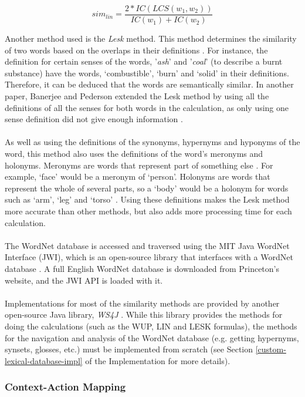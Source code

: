 \documentclass[11pt]{article}
\begin{document}
$$sim_{lin} = \frac{2*IC(LCS(w_1,w_2))}{IC(w_1)+IC(w_2)}$$

Another method used is the \textit{Lesk} method. This method determines the similarity of two words based on the overlaps in their definitions \cite{RefWorks:115}. For instance, the definition for certain senses of the words, '\textit{ash}' and '\textit{coal}' (to describe a burnt substance) have the words, `combustible', `burn' and `solid' in their definitions. Therefore, it can be deduced that the words are semantically similar. In another paper, Banerjee and Pederson extended the Lesk method by using all the definitions of all the senses for both words in the calculation, as only using one sense definition did not give enough information \cite{RefWorks:117}.
\\
\\
As well as using the definitions of the synonyms, hypernyms and hyponyms of the word, this method also uses the definitions of the word's meronyms and holonyms. Meronyms are words that represent part of something else \cite{RefWorks:121}. For example, `face' would be a meronym of `person'. Holonyms are words that represent the whole of several parts, so a `body' would be a holonym for words such as `arm', `leg' and `torso' \cite{RefWorks:121}. Using these definitions makes the Lesk method more accurate than other methods, but also adds more processing time for each calculation.
\\
\\
The WordNet database is accessed and traversed using the MIT Java WordNet Interface (JWI), which is an open-source library that interfaces with a WordNet database \cite{RefWorks:118}. A full English WordNet database is downloaded from Princeton's website, and the JWI API is loaded with it.
\\
\\
Implementations for most of the similarity methods are provided by another open-source Java library, \textit{WS4J} \cite{RefWorks:116}. While this library provides the methods for doing the calculations (such as the WUP, LIN and LESK formulas), the methods for the navigation and analysis of the WordNet database (e.g. getting hypernyms, synsets, glosses, etc.) must be implemented from scratch (see Section \ref{custom-lexical-database-impl} of the Implementation for more details).

\subsubsection{Context-Action Mapping}
\end{document}

